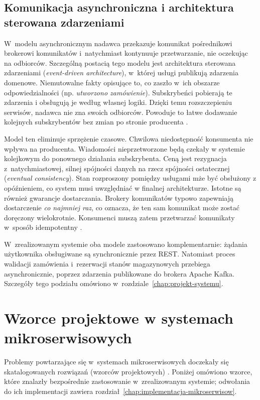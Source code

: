 \subsection{Komunikacja asynchroniczna i architektura sterowana zdarzeniami}
\label{subsec:komunikacja-asynchroniczna}

W~modelu asynchronicznym nadawca przekazuje komunikat pośrednikowi brokerowi komunikatów i~natychmiast
kontynuuje przetwarzanie, nie oczekując na odbiorców. Szczególną postacią tego modelu jest architektura sterowana
zdarzeniami (\emph{event-driven architecture}), w~której usługi publikują zdarzenia domenowe. Niemutowalne fakty
opisujące to, co zaszło w~ich obszarze odpowiedzialności (np. \emph{utworzono zamówienie}). Subskrybeńci 
pobierają te zdarzenia i obsługują je według własnej logiki. Dzięki temu rozszczepieniu serwisów, nadawca nie zna swoich
odbiorców. Powoduje to łatwe dodawanie kolejnych subskrybentów bez zmian po stronie producenta \parencite{kleppmann2017}.

Model ten eliminuje sprzężenie czasowe. Chwilowa niedostępność konsumenta nie wpływa na producenta.
Wiadomości nieprzetworzone będą czekały w systemie kolejkowym do ponownego działania subskrybenta. 
Ceną jest rezygnacja z~natychmiastowej, silnej spójności danych na rzecz spójności ostatecznej (\emph{eventual consistency}).
Stan rozproszony pomiędzy usługami mże być obsłużony z opóźnieniem, co system musi uwzględniać w finalnej architekturze.
Istotne są również gwarancje dostarczania. Brokery komunikatów typowo zapewniają dostarczenie \emph{co najmniej raz}, co oznacza, że ten
sam komunikat może zostać doręczony wielokrotnie. Konsumenci muszą zatem przetwarzać komunikaty w~sposób idempotentny \parencite{kleppmann2017}.

W~zrealizowanym systemie oba modele zastosowano komplementarnie: żądania użytkownika obsługiwane są synchronicznie
przez REST. Natomiast proces walidacji zamówienia i~rezerwacji stanów magazynowych przebiega asynchronicznie, poprzez
zdarzenia publikowane do brokera Apache Kafka. Szczegóły tego podziału omówiono w~rozdziale~\ref{chap:projekt-systemu}.

\section{Wzorce projektowe w systemach mikroserwisowych}
\label{sec:wzorce-projektowe}

Problemy powtarzające się w~systemach mikroserwisowych doczekały się skatalogowanych rozwiązań (wzorców
projektowych) \parencite{richardson2018}. Poniżej omówiono wzorce, które znalazły bezpośrednie zastosowanie
w~zrealizowanym systemie; odwołania do ich implementacji zawiera rozdział~\ref{chap:implementacja-mikroserwisow}.

